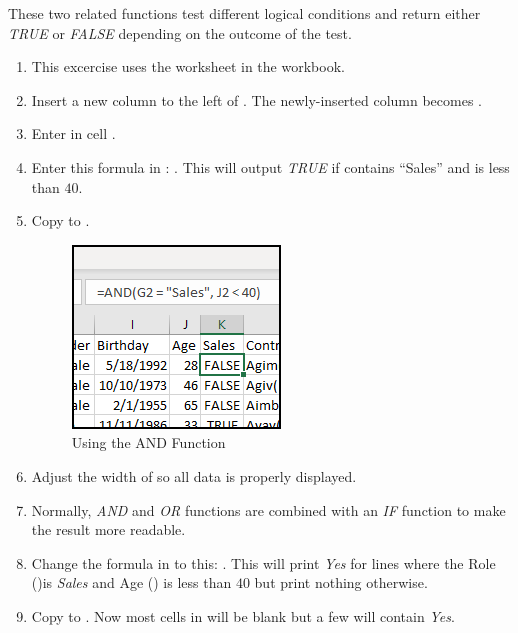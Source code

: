 These two related functions test different logical conditions and return either \textit{TRUE} or \textit{FALSE} depending on the outcome of the test. 

\begin{enumerate}
	\item This excercise uses the  worksheet in the  workbook.
	\item Insert a new column to the left of . The newly-inserted column becomes .
	\item Enter  in cell .
	\item Enter this formula in : . This will output \textit{TRUE} if  contains ``Sales'' and  is less than $ 40 $. 
	\item Copy  to .
	
	\begin{figure}[H]
		\centering
		\includegraphics[width=\maxwidth{.95\linewidth}]{gfx/ch09_fig47}
		\caption{Using the AND Function}
		\label{09:fig47}
	\end{figure}
	
	\item Adjust the width of  so all data is properly displayed.

	\item Normally, \textit{AND} and \textit{OR} functions are combined with an \textit{IF} function to make the result more readable.
	\item Change the formula in  to this: . This will print \textit{Yes} for lines where the Role ()is \textit{Sales} and Age () is less than $ 40 $ but print nothing otherwise. 
	\item Copy  to . Now most cells in  will be blank but a few will contain \textit{Yes}.
\end{enumerate}

